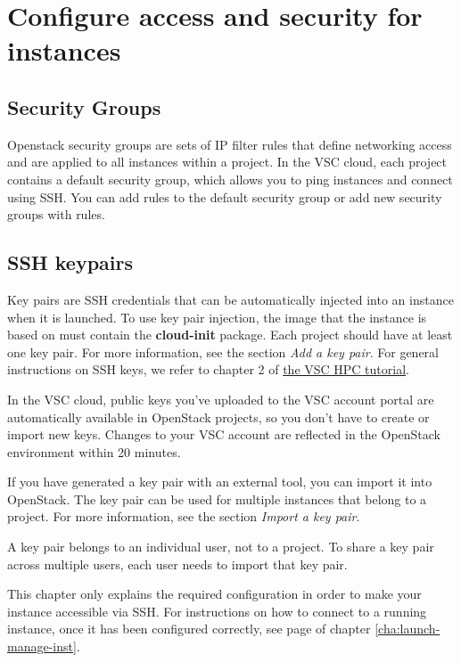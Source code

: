 \chapter{Configure access and security for instances}\label{cha:conf-access-secur}

\section{Security Groups}
Openstack security groups are sets of IP filter rules that define
networking access and are applied to all instances within a project.
In the VSC cloud, each project contains a default security group,
which allows you to ping instances and connect using SSH.  You can add
rules to the default security group or add new security groups with
rules.

\section{SSH keypairs}
Key pairs are SSH credentials that can be automatically injected into
an instance when it is launched. To use key pair injection, the image
that the instance is based on must contain the \textbf{cloud-init}
package. Each project should have at least one key pair. For more
information, see the section \emph{Add a key pair}.  For general
instructions on SSH keys, we refer to chapter 2 of
\href{https://www.vscentrum.be/support/tut-book/vsc-tutorials}{the VSC
  HPC tutorial}.

 In the VSC cloud, public keys you've uploaded to the
VSC account portal are automatically available in OpenStack projects,
so you don't have to create or import new keys.  Changes to your VSC
account are reflected in the OpenStack environment within 20 minutes.

If you have generated a key pair with an external tool, you can import
it into \gls{OpenStack}. The key pair can be used for multiple
instances that belong to a project. For more information, see the
section \emph{Import a key pair}.

 A key pair belongs to an individual user, not to a
project. To share a key pair across multiple users, each user needs to
import that key pair.

 This chapter only explains the required configuration
in order to make your instance accessible via SSH.  For instructions
on how to connect to a running instance, once it has been configured
correctly, see page \pageref{connect-to-your-instance-using-ssh} of
chapter \ref{cha:launch-manage-inst}.

